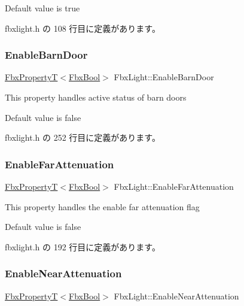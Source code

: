 Default value is true 

 fbxlight.\+h の 108 行目に定義があります。

\mbox{\label{class_fbx_light_add61baef63184934eeb71ede6328354c}} 
\subsubsection{\texorpdfstring{Enable\+Barn\+Door}{EnableBarnDoor}}
{\footnotesize\ttfamily \hyperlink{class_fbx_property_t}{Fbx\+PropertyT}$<$\hyperlink{fbxtypes_8h_a92e0562b2fe33e76a242f498b362262e}{Fbx\+Bool}$>$ Fbx\+Light\+::\+Enable\+Barn\+Door}

This property handles active status of barn doors

Default value is false 

 fbxlight.\+h の 252 行目に定義があります。

\mbox{\label{class_fbx_light_a65848a9a9d7afb4c576efa5376138a06}} 
\subsubsection{\texorpdfstring{Enable\+Far\+Attenuation}{EnableFarAttenuation}}
{\footnotesize\ttfamily \hyperlink{class_fbx_property_t}{Fbx\+PropertyT}$<$\hyperlink{fbxtypes_8h_a92e0562b2fe33e76a242f498b362262e}{Fbx\+Bool}$>$ Fbx\+Light\+::\+Enable\+Far\+Attenuation}

This property handles the enable far attenuation flag

Default value is false 

 fbxlight.\+h の 192 行目に定義があります。

\mbox{\label{class_fbx_light_ae9bf8b3fa56b50962615f78e999f3371}} 
\subsubsection{\texorpdfstring{Enable\+Near\+Attenuation}{EnableNearAttenuation}}
{\footnotesize\ttfamily \hyperlink{class_fbx_property_t}{Fbx\+PropertyT}$<$\hyperlink{fbxtypes_8h_a92e0562b2fe33e76a242f498b362262e}{Fbx\+Bool}$>$ Fbx\+Light\+::\+Enable\+Near\+Attenuation}


